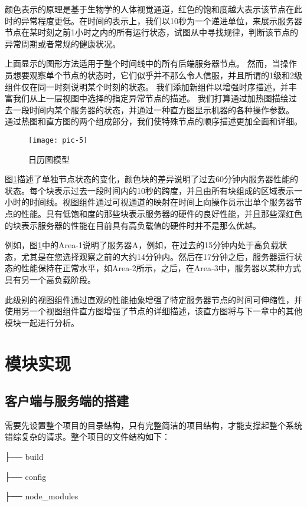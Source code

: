 颜色表示的原理是基于生物学的人体视觉通道，红色的饱和度越大表示该节点在此时的异常程度更低。在时间的表示上，我们以10秒为一个递进单位，来展示服务器节点在某时刻之前1小时之内的所有运行状态，试图从中寻找规律，判断该节点的异常周期或者常规的健康状况。

上面显示的图形方法适用于整个时间线中的所有后端服务器节点。 然而，当操作员想要观察单个节点的状态时，它们似乎并不那么令人信服，并且所谓的1级和2级组件仅在同一时刻说明某个时刻的状态。 我们添加新组件以增强时序描述，并丰富我们从上一层视图中选择的指定异常节点的描述。 我们打算通过加热图描绘过去一段时间内某个服务器的状态，并通过一种直方图显示机器的各种操作参数。 通过热图和直方图的两个组成部分，我们使特殊节点的顺序描述更加全面和详细。

\begin{figure}[h]
	\centering
	\texttt{[image: pic-5]}
	\caption{日历图模型}
	\label{fig-5}
\end{figure}

图\ref{fig-5}描述了单独节点状态的变化，颜色块的差异说明了过去60分钟内服务器性能的状态。每个块表示过去一段时间内的10秒的跨度，并且由所有块组成的区域表示一小时的时间线。视图组件通过可视通道的映射在时间上向操作员示出单个服务器节点的性能。具有低饱和度的那些块表示服务器的硬件的良好性能，并且那些深红色的块表示服务器的性能在目前具有高负载值的硬件时并不是那么优越。

例如，图\ref{fig-5}中的Area-1说明了服务器A，例如，在过去的15分钟内处于高负载状态，尤其是在您选择观察之前的大约14分钟内。然后在17分钟之后，服务器运行状态的性能保持在正常水平，如Area-2所示，之后，在Area-3中，服务器以某种方式具有另一个高负载阶段。

此级别的视图组件通过直观的性能抽象增强了特定服务器节点的时间可伸缩性，并使用另一个视图组件直方图增强了节点的详细描述，该直方图将与下一章中的其他模块一起进行分析。

\section{模块实现}
\subsection{客户端与服务端的搭建}

需要先设置整个项目的目录结构，只有完整简洁的项目结构，才能支撑起整个系统错综复杂的请求。整个项目的文件结构如下：

├── build

├── config

├── node\_modules

